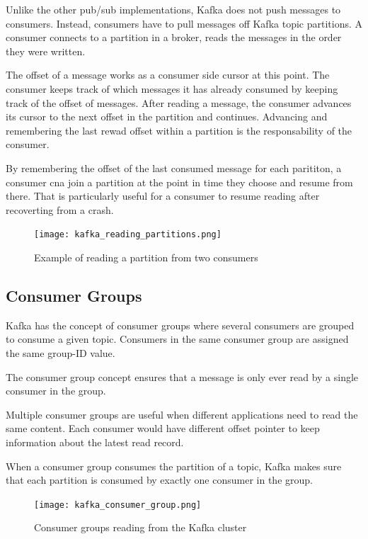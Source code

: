 Unlike the other pub/sub implementations, Kafka does not push messages to
consumers.
Instead, consumers have to pull messages off Kafka topic partitions. A consumer
connects to a partition in a broker, reads the messages in the order they were
written.

The offset of a message works as a consumer side cursor at this point.
The consumer keeps track of which messages it has already consumed by keeping
track of the offset of messages. After reading a message, the consumer advances
its cursor to the next offset in the partition and continues.
Advancing and remembering the last rewad offset within a partition is the
responsability of the consumer.

By remembering the offset of the last consumed message for each parititon, a
consumer cna join a partition at the point in time they choose and resume from
there. That is particularly useful for a consumer to resume reading after
recoverting from a crash.

\begin{figure}[ht]
    \centering
    \texttt{[image: kafka\_reading\_partitions.png]}
    \caption{Example of reading a partition from two consumers}
\end{figure}

\subsection{Consumer Groups}

Kafka has the concept of consumer groups where several consumers are grouped
to consume a given topic. Consumers in the same consumer group are assigned the
same group-ID value.

The consumer group concept ensures that a message is only ever read by a single
consumer in the group.

Multiple consumer groups are useful when different applications need to read
the same content. Each consumer would have different offset pointer to keep
information about the latest read record.

When a consumer group consumes the partition of a topic, Kafka makes sure that
each partition is consumed by exactly one consumer in the group.

\begin{figure}[ht]
    \centering
    \texttt{[image: kafka\_consumer\_group.png]}
    \caption{Consumer groups reading from the Kafka cluster}
\end{figure}

